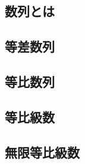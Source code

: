 ﻿%
            \subsection{数列とは}

            \subsection{等差数列}

            \subsection{等比数列}

            \subsection{等比級数}

            \subsection{無限等比級数}

